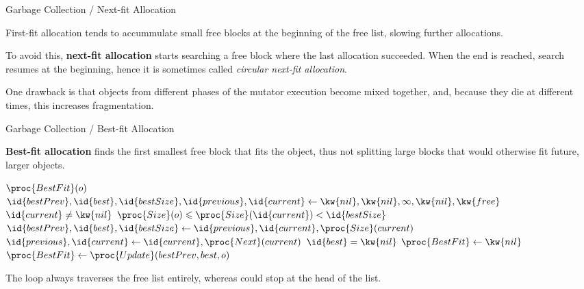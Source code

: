 \documentclass[compress,dvipdfmx]{beamer}
\begin{document}
%
\begin{frame}{Garbage Collection / Next-fit Allocation}

  First-fit allocation tends to accummulate small free blocks at the
  beginning of the free list, slowing further allocations.

  \bigskip

  To avoid this, \textbf{next-fit allocation} starts searching a free
  block where the last allocation succeeded. When the end is reached,
  search resumes at the beginning, hence it is sometimes called
  \emph{circular next-fit allocation}.

  \bigskip

  One drawback is that objects from different phases of the mutator
  execution become mixed together, and, because they die at different
  times, this increases fragmentation.

\end{frame}

%
\begin{frame}{Garbage Collection / Best-fit Allocation}

  \textbf{Best-fit allocation} finds the first smallest free block
  that fits the object, thus not splitting large blocks that would
  otherwise fit future, larger objects.
  \begin{codebox}
    \(\proc{BestFit}(o)\)\\
    \li \(\id{bestPrev}, \id{best}, \id{bestSize}, \id{previous}, \id{current}
          \gets \kw{nil}, \kw{nil}, \infty, \kw{nil}, \kw{free}\)
    \li \While \(\id{current} \neq \kw{nil}\) 
    \li \> \If \(\proc{Size}(o) \leqslant \proc{Size}(\id{current})
                < \id{bestSize}\)
    \li    \Then \(\id{bestPrev}, \id{best}, \id{bestSize} \gets
                   \id{previous}, \id{current}, \proc{Size}(current)\)
           \End
    \li \> \(\id{previous}, \id{current} \gets \id{current}, \proc{Next}(current)\)
    \li \If \(\id{best} = \kw{nil}\)
    \li \Then \(\proc{BestFit} \gets \kw{nil}\)
    \li \Else \(\proc{BestFit} \gets \proc{Update}(bestPrev, best, o)\)
        \End
  \end{codebox}
  The loop always traverses the free list entirely, whereas
   could stop at the head of the list.

\end{frame}
\end{document}
